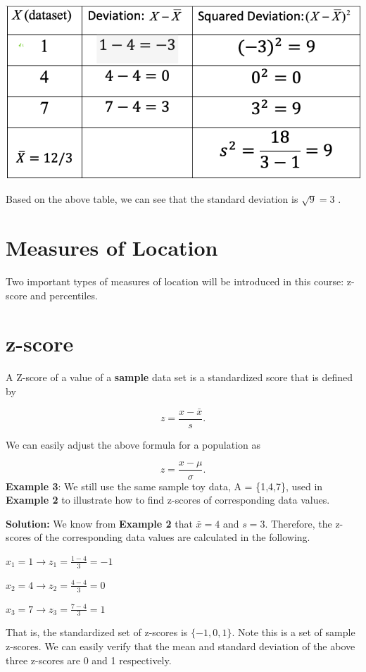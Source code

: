 \documentclass[
]{book}
\begin{document}
\begin{center}\includegraphics[width=0.55\linewidth]{week02/varCalc} \end{center}

Based on the above table, we can see that the standard deviation is \(\sqrt{9} = 3\) .

\hypertarget{measures-of-location}{%
\section{Measures of Location}\label{measures-of-location}}

Two important types of measures of location will be introduced in this course: z-score and percentiles.

\hypertarget{z-score}{%
\section{z-score}\label{z-score}}

A Z-score of a value of a \textbf{sample} data set is a standardized score that is defined by

\[
z = \frac{x - \bar{x}}{s}.
\]

We can easily adjust the above formula for a population as

\[
z = \frac{x - \mu}{\sigma}.
\]
\textbf{Example 3}: We still use the same sample toy data, A = \{1,4,7\}, used in \textbf{Example 2} to illustrate how to find z-scores of corresponding data values.

\textbf{Solution: } We know from \textbf{Example 2} that \(\bar{x} = 4\) and \(s = 3\). Therefore, the z-scores of the corresponding data values are calculated in the following.

\(x_1 = 1 \to z_1 = \frac{1 - 4}{3} = -1\)

\(x_2 = 4 \to z_2 = \frac{4 - 4}{3} = 0\)

\(x_3 = 7 \to z_3 = \frac{7 - 4}{3} = 1\)

That is, the standardized set of z-scores is \(\{ -1, 0, 1\}\). Note this is a set of sample z-scores. We can easily verify that the mean and standard deviation of the above three z-scores are 0 and 1 respectively.
\end{document}

